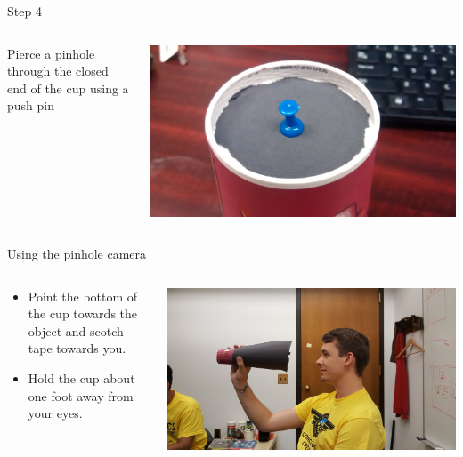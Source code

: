 \begin{frame}{Step 4}
  \begin{columns}
    \begin{column}{0.6\textwidth}
      Pierce a pinhole through the closed end of the cup using a push pin
    \end{column}
    \begin{column}{0.4\textwidth}
      \includegraphics[width=\textwidth]{media/pushpin.jpg}
    \end{column}
  \end{columns}
\end{frame}

\begin{frame}{Using the pinhole camera}
  \begin{columns}
    \begin{column}{0.6\textwidth}
      \begin{itemize}
        \item
          Point the bottom of the cup towards the object and scotch tape towards you.\\
        \item
          Hold the cup about one foot away from your eyes.
      \end{itemize}
    \end{column}
    \begin{column}{0.4\textwidth}
      \includegraphics[width=\textwidth,trim=5in 0 3in 0,clip]{media/how-to-use-pinhole-campera.jpg}
    \end{column}
  \end{columns}
\end{frame}

